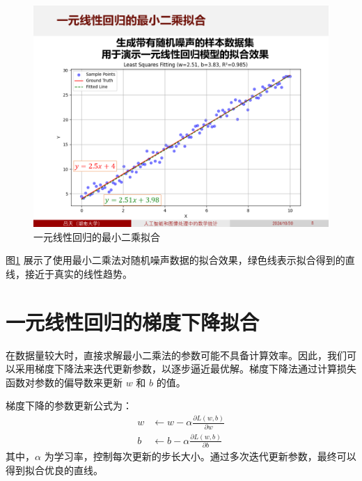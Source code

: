 \documentclass[
    report,     %
    oneside,    %
    UTF8,       %
    zihao=-4    %
]{config} %
\begin{document}
\begin{figure}[H]
    \centering
    \includegraphics[width=\linewidth]{figures/回归分析与梯度下降/1.PNG}
    \caption{一元线性回归的最小二乘拟合}
    \label{fig:linear_least_squares}
\end{figure}

图\ref{fig:linear_least_squares} 展示了使用最小二乘法对随机噪声数据的拟合效果，绿色线表示拟合得到的直线，接近于真实的线性趋势。

\section{一元线性回归的梯度下降拟合}

在数据量较大时，直接求解最小二乘法的参数可能不具备计算效率。因此，我们可以采用梯度下降法来迭代更新参数，以逐步逼近最优解。梯度下降法通过计算损失函数对参数的偏导数来更新 $w$ 和 $b$ 的值。

梯度下降的参数更新公式为：
\begin{align}
    w &\leftarrow w - \alpha \frac{\partial L(w, b)}{\partial w} \\
    b &\leftarrow b - \alpha \frac{\partial L(w, b)}{\partial b}
\end{align}
其中，$\alpha$ 为学习率，控制每次更新的步长大小。通过多次迭代更新参数，最终可以得到拟合优良的直线。
\end{document}
